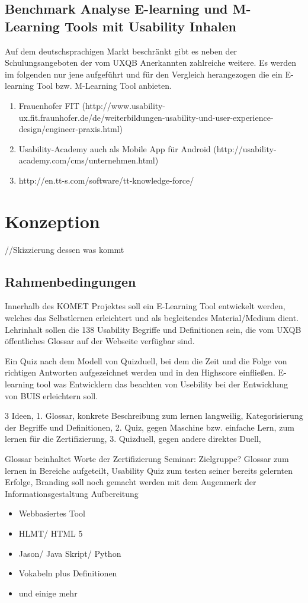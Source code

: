 \documentclass[a4paper, 12pt, twoside, BCOR=20mm, DIV=calc, abstracton, parskip=half*, toc=bibliography, toc=listof, headsepline, footsepline, headings=small, numbers=enddot]{scrreprt}
\begin{document}
\section{Benchmark Analyse E-learning und M-Learning Tools mit Usability Inhalen}
Auf dem deutschsprachigen Markt beschränkt gibt es neben der Schulungsangeboten der vom \ac{UXQB} Anerkannten zahlreiche weitere. Es werden im folgenden nur jene aufgeführt und für den Vergleich herangezogen die ein E-learning Tool bzw. M-Learning Tool anbieten. 
\begin{enumerate}
	\item Frauenhofer FIT (http://www.usability-ux.fit.fraunhofer.de/de/weiterbildungen-usability-und-user-experience-design/engineer-praxis.html)
	\item Usability-Academy  auch als Mobile App für Android (http://usability-academy.com/cms/unternehmen.html)
	\item http://en.tt-s.com/software/tt-knowledge-force/
\end{enumerate}


\chapter{Konzeption} //Skizzierung dessen was kommt 
\section{Rahmenbedingungen}
Innerhalb des KOMET Projektes soll ein E-Learning Tool entwickelt werden, welches das Selbstlernen erleichtert und als begleitendes Material/Medium dient. Lehrinhalt sollen die 138 Usability Begriffe und Definitionen sein, die vom UXQB öffentliches Glossar auf der Webseite verfügbar sind. 

Ein Quiz nach dem Modell von Quizduell, bei dem die Zeit und die Folge von richtigen Antworten aufgezeichnet werden und in den Highscore einfließen.
E-learning tool was Entwicklern das beachten von Usebility bei der Entwicklung von BUIS erleichtern soll.  

3 Ideen, 
1. Glossar, konkrete Beschreibung zum lernen langweilig, Kategorisierung der Begriffe und Definitionen, 
2. Quiz, gegen Maschine bzw. einfache Lern, zum lernen für die Zertifizierung,
3. Quizduell, gegen andere direktes Duell, 

Glossar beinhaltet Worte der Zertifizierung Seminar: Zielgruppe? 
Glossar zum lernen in Bereiche aufgeteilt, Usability Quiz zum testen seiner bereits gelernten Erfolge, 
Branding soll noch gemacht werden mit dem Augenmerk der Informationsgestaltung Aufbereitung
\begin{itemize}
	\item{Webbasiertes Tool}
	\item{HLMT/ HTML 5}
	\item{Jason/ Java Skript/ Python}
	\item{Vokabeln plus Definitionen}
	\item und einige mehr  
	\end{itemize}
	
\end{document}
